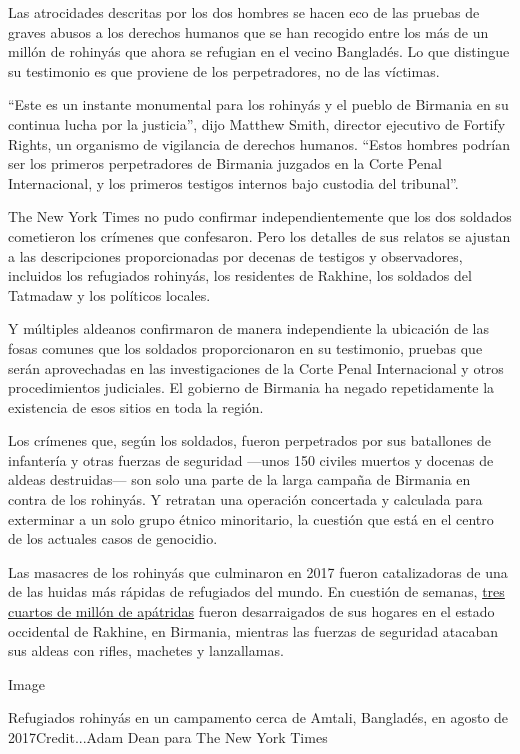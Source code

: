 Las atrocidades descritas por los dos hombres se hacen eco de las
pruebas de graves abusos a los derechos humanos que se han recogido
entre los más de un millón de rohinyás que ahora se refugian en el
vecino Bangladés. Lo que distingue su testimonio es que proviene de los
perpetradores, no de las víctimas.

``Este es un instante monumental para los rohinyás y el pueblo de
Birmania en su continua lucha por la justicia'', dijo Matthew Smith,
director ejecutivo de Fortify Rights, un organismo de vigilancia de
derechos humanos. ``Estos hombres podrían ser los primeros perpetradores
de Birmania juzgados en la Corte Penal Internacional, y los primeros
testigos internos bajo custodia del tribunal''.

The New York Times no pudo confirmar independientemente que los dos
soldados cometieron los crímenes que confesaron. Pero los detalles de
sus relatos se ajustan a las descripciones proporcionadas por decenas de
testigos y observadores, incluidos los refugiados rohinyás, los
residentes de Rakhine, los soldados del Tatmadaw y los políticos
locales.

Y múltiples aldeanos confirmaron de manera independiente la ubicación de
las fosas comunes que los soldados proporcionaron en su testimonio,
pruebas que serán aprovechadas en las investigaciones de la Corte Penal
Internacional y otros procedimientos judiciales. El gobierno de Birmania
ha negado repetidamente la existencia de esos sitios en toda la región.

Los crímenes que, según los soldados, fueron perpetrados por sus
batallones de infantería y otras fuerzas de seguridad ---unos 150
civiles muertos y docenas de aldeas destruidas--- son solo una parte de
la larga campaña de Birmania en contra de los rohinyás. Y retratan una
operación concertada y calculada para exterminar a un solo grupo étnico
minoritario, la cuestión que está en el centro de los actuales casos de
genocidio.

Las masacres de los rohinyás que culminaron en 2017 fueron catalizadoras
de una de las huidas más rápidas de refugiados del mundo. En cuestión de
semanas,
\href{https://www.nytimes3xbfgragh.onion/es/2019/08/26/espanol/mundo/rohinya-exodo-banglades.html}{tres
cuartos de millón de apátridas} fueron desarraigados de sus hogares en
el estado occidental de Rakhine, en Birmania, mientras las fuerzas de
seguridad atacaban sus aldeas con rifles, machetes y lanzallamas.

Image

Refugiados rohinyás en un campamento cerca de Amtali, Bangladés, en
agosto de 2017Credit...Adam Dean para The New York Times

